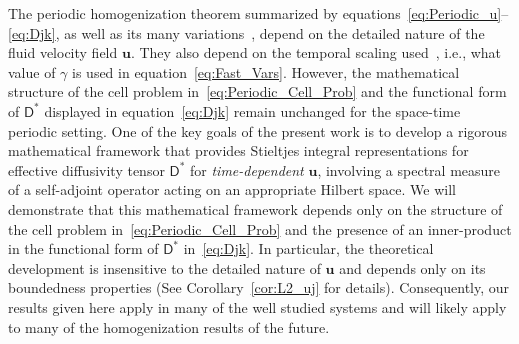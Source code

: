 \documentclass[leqno,onefignum,onetabnum]{siamltex1213}
\newcommand{\corref}[1]{Corollary~\ref{#1}}
\newcommand{\Dm}{\mathsf{D}}
\newcommand{\vecu}{\boldsymbol{u}}
\begin{document}
The periodic homogenization theorem summarized by
equations~\eqref{eq:Periodic_u}--\eqref{eq:Djk}, as well as its many
variations~\cite{Bensoussan:Book:1978,Papanicolaou:1981:36:8,Bhattacharya:1985:AnnProb:13:2:385,Bhattacharya:1989:ASD,McLaughlin:SIAM_JAM:780,Avellaneda:CMP-339,Pavliotis:PHD_Thesis,Pavliotis:IMAJAM:951,Pavliotis:CMS:2007:507,McLaughlin:Forest:PF:1999:880,Majda:Kramer:1999:book}, 
depend on the detailed nature of the fluid velocity field
$\vecu$. They also depend on the temporal scaling
used~\cite{Bhattacharya:1989:ASD,Pavliotis:PHD_Thesis,Majda:Kramer:1999:book},
i.e., what value of $\gamma$ is used in
equation~\eqref{eq:Fast_Vars}. However, the mathematical structure of
the cell problem in~\eqref{eq:Periodic_Cell_Prob} and the functional
form of $\Dm^*$ displayed in equation~\eqref{eq:Djk} remain
unchanged for the space-time periodic setting. One of the key goals of
the present work is to develop a rigorous mathematical framework that
provides Stieltjes integral representations for effective diffusivity
tensor $\Dm^*$ for \emph{time-dependent} $\vecu$, involving a spectral
measure of a self-adjoint operator acting on an appropriate Hilbert
space. We will demonstrate that this 
mathematical framework depends only on the structure of the cell
problem in~\eqref{eq:Periodic_Cell_Prob} and the presence of an
inner-product in the functional form of $\Dm^*$ in~\eqref{eq:Djk}. In
particular, the theoretical development is 
insensitive to the detailed nature of $\vecu$ and depends only
on its boundedness properties (See \corref{cor:L2_uj} for
details). Consequently, our results given here apply in many of the
well studied systems and will likely apply to many of the
homogenization results of the future.          
\end{document}
